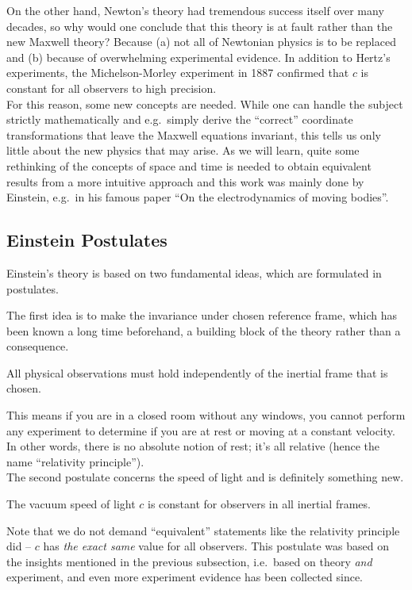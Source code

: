 On the other hand, Newton's theory had tremendous success itself over many decades, so why would one conclude that this theory is at fault rather than the new Maxwell theory? Because (a) not all of Newtonian physics is to be replaced and (b) because of overwhelming experimental evidence. In addition to Hertz's experiments, the Michelson-Morley experiment in 1887 confirmed that $c$ is constant for all observers to high precision.\\


For this reason, some new concepts are needed. While one can handle the subject strictly mathematically and e.g.~simply derive the \enquote{correct} coordinate transformations that leave the Maxwell equations invariant, this tells us only little about the new physics that may arise. As we will learn, quite some rethinking of the concepts of space and time is needed to obtain equivalent results from a more intuitive approach and this work was mainly done by Einstein, e.g.~in his famous paper \enquote{On the electrodynamics of moving bodies}.



		\subsection{Einstein Postulates}
Einstein's theory is based on two fundamental ideas, which are formulated in postulates.

The first idea is to make the invariance under chosen reference frame, which has been known a long time beforehand, a building block of the theory rather than a consequence.
\begin{post}
	All physical observations must hold independently of the inertial frame that is chosen.
\end{post}
This means if you are in a closed room without any windows, you cannot perform any experiment to determine if you are at rest or moving at a constant velocity. In other words, there is no absolute notion of rest; it's all relative (hence the name \enquote{relativity principle}).\\


The second postulate concerns the speed of light and is definitely something new.
\begin{post}\label{post:c_constant}
	The vacuum speed of light $c$ is constant for observers in all inertial frames.
\end{post}
Note that we do not demand \enquote{equivalent} statements like the relativity principle did -- $c$ has \emph{the exact same} value for all observers. This postulate was based on the insights mentioned in the previous subsection, i.e.~based on theory \emph{and} experiment, and even more experiment evidence has been collected since.

